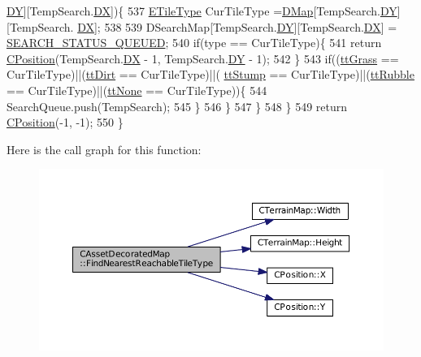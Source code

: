 \begin{DoxyCode}
      \hyperlink{structSSearchTile_a5a7b0a0b5d8efc7a01175625a012abd1}{DY}][TempSearch.\hyperlink{structSSearchTile_a08045e94e80c5c6e98f23313139853c6}{DX}])\{
537                 \hyperlink{classCTerrainMap_aff2ab991e237269941416dd79d8871d4}{ETileType} CurTileType =\hyperlink{classCTerrainMap_a80d154ce478948b10473534a7bca13f6}{DMap}[TempSearch.\hyperlink{structSSearchTile_a5a7b0a0b5d8efc7a01175625a012abd1}{DY}][TempSearch.
      \hyperlink{structSSearchTile_a08045e94e80c5c6e98f23313139853c6}{DX}];
538                 
539                 DSearchMap[TempSearch.\hyperlink{structSSearchTile_a5a7b0a0b5d8efc7a01175625a012abd1}{DY}][TempSearch.\hyperlink{structSSearchTile_a08045e94e80c5c6e98f23313139853c6}{DX}] = 
      \hyperlink{AssetDecoratedMap_8cpp_a6491ccf61b14bffb63a14347d9c616e6}{SEARCH\_STATUS\_QUEUED};
540                 \textcolor{keywordflow}{if}(type == CurTileType)\{
541                     \textcolor{keywordflow}{return} \hyperlink{classCPosition}{CPosition}(TempSearch.\hyperlink{structSSearchTile_a08045e94e80c5c6e98f23313139853c6}{DX} - 1, TempSearch.\hyperlink{structSSearchTile_a5a7b0a0b5d8efc7a01175625a012abd1}{DY} - 1);
542                 \}
543                 \textcolor{keywordflow}{if}((\hyperlink{classCTerrainMap_aff2ab991e237269941416dd79d8871d4ae587716ed26a437b6ea33f0ac823d47a}{ttGrass} == CurTileType)||(\hyperlink{classCTerrainMap_aff2ab991e237269941416dd79d8871d4a49fb754039632e7127fca005dd95bab8}{ttDirt} == CurTileType)||(
      \hyperlink{classCTerrainMap_aff2ab991e237269941416dd79d8871d4ac6008e344fb024b62741b2ffaef042ef}{ttStump} == CurTileType)||(\hyperlink{classCTerrainMap_aff2ab991e237269941416dd79d8871d4a0969ea4c56acb3f5acf137c0d06a3371}{ttRubble} == CurTileType)||(\hyperlink{classCTerrainMap_aff2ab991e237269941416dd79d8871d4a481e779132fb16414d17870bd6229eb5}{ttNone} == CurTileType))\{
544                     SearchQueue.push(TempSearch);
545                 \}
546             \}
547         \}
548     \}
549     \textcolor{keywordflow}{return} \hyperlink{classCPosition}{CPosition}(-1, -1);
550 \}
\end{DoxyCode}
Here is the call graph for this function\+:
\nopagebreak
\begin{figure}[H]
\begin{center}
\leavevmode
\includegraphics[width=350pt]{classCAssetDecoratedMap_a9e9eed95b427443d196b56b852cdeb9d_cgraph}
\end{center}
\end{figure}
